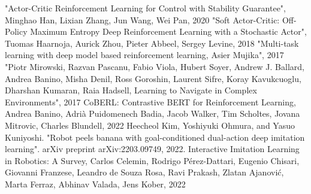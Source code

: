 \documentclass[a4j, twocolumn, 10pt,pdflatex,ja=standard]{bxjsarticle}
\begin{document}
\begin{thebibliography}{99}
 "Actor-Critic Reinforcement Learning for Control with Stability Guarantee", Minghao Han, Lixian Zhang, Jun Wang, Wei Pan, 2020
 "Soft Actor-Critic: Off-Policy Maximum Entropy Deep Reinforcement Learning with a Stochastic Actor", Tuomas Haarnoja, Aurick Zhou, Pieter Abbeel, Sergey Levine, 2018
 "Multi-task learning with deep model based reinforcement learning, Asier Mujika", 2017
 "Piotr Mirowski, Razvan Pascanu, Fabio Viola, Hubert Soyer, Andrew J. Ballard, Andrea Banino, Misha Denil, Ross Goroshin, Laurent Sifre, Koray Kavukcuoglu, Dharshan Kumaran, Raia Hadsell, Learning to Navigate in Complex Environments", 2017
 CoBERL: Contrastive BERT for Reinforcement Learning, Andrea Banino, Adrià Puidomenech Badia, Jacob Walker, Tim Scholtes, Jovana Mitrovic, Charles Blundell, 2022
 Heecheol Kim, Yoshiyuki Ohmura, and Yasuo Kuniyoshi. "Robot peels banana with goal-conditioned dual-action deep imitation learning". arXiv preprint arXiv:2203.09749, 2022.
Interactive Imitation Learning in Robotics: A Survey, Carlos Celemin, Rodrigo Pérez-Dattari, Eugenio Chisari, Giovanni Franzese, Leandro de Souza Rosa, Ravi Prakash, Zlatan Ajanović, Marta Ferraz, Abhinav Valada, Jens Kober, 2022

\end{thebibliography}
\end{document}
